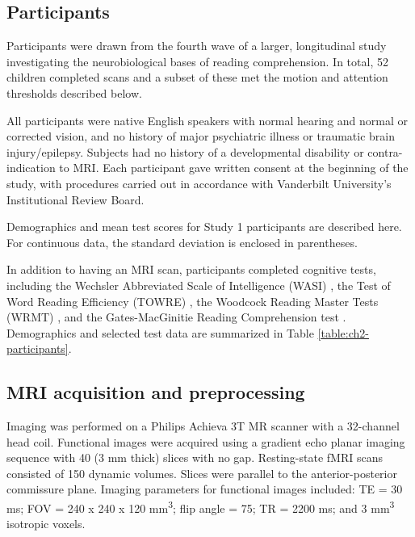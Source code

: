 \subsection{Participants}

Participants were drawn from the fourth wave of a larger, longitudinal study investigating the neurobiological bases of reading comprehension. In total, 52 children completed scans and a subset of these met the motion and attention thresholds described below.

All participants were native English speakers with normal hearing and normal or corrected vision, and no history of major psychiatric illness or traumatic brain injury/epilepsy. Subjects had no history of a developmental disability or contra-indication to MRI.  Each participant gave written consent at the beginning of the study, with procedures carried out in accordance with Vanderbilt University’s Institutional Review Board.

\begin{table}
    \renewcommand{\tabcolsep}{0.09cm}
    \centering
    
    \caption[Participant demographics]{Demographics and mean test scores for Study 1 participants are described here. For continuous data, the standard deviation is enclosed in parentheses.}
    \label{table:ch2-participants}
\end{table}

In addition to having an MRI scan, participants completed cognitive tests, including the Wechsler Abbreviated Scale of Intelligence (WASI) \citep{Kaplan1999}, the Test of Word Reading Efficiency (TOWRE) \citep{Torgesen2012}, the Woodcock Reading Master Tests (WRMT) \citep{Woodcock1998}, and the Gates-MacGinitie Reading Comprehension test \citep{MacGinitie2000}. Demographics and selected test data are summarized in Table \ref{table:ch2-participants}.

\subsection{MRI acquisition and preprocessing}

Imaging was performed on a Philips Achieva 3T MR scanner with a 32-channel head coil. Functional images were acquired using a gradient echo planar imaging sequence with 40 (3 mm thick) slices with no gap. Resting-state fMRI scans consisted of 150 dynamic volumes. Slices were parallel to the anterior-posterior commissure plane. Imaging parameters for functional images included: TE = 30 ms; FOV = 240 x 240 x 120 mm\textsuperscript{3}; flip angle = 75\degree; TR = 2200 ms; and 3 mm\textsuperscript{3} isotropic voxels.


